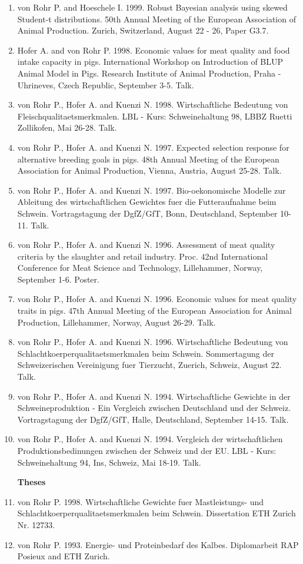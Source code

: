 \documentclass[11pt,a4paper]{scrartcl}
\begin{document}
\begin{enumerate}
\item von Rohr P. and Hoeschele I. 1999. Robust Bayesian analysis using skewed Student-t distributions. 50th Annual Meeting of the European Association of Animal Production.  Zurich, Switzerland, August 22 - 26, Paper G3.7. 
\item Hofer A. and von Rohr P. 1998. Economic values for meat quality and food intake capacity in pigs. International Workshop on Introduction of BLUP Animal Model in Pigs. Research Institute of Animal Production, Praha - Uhrineves, Czech Republic, September 3-5. Talk. 
\item von Rohr P., Hofer A. and Kuenzi N. 1998. Wirtschaftliche Bedeutung von Fleischqualitaetsmerkmalen. LBL - Kurs: Schweinehaltung 98, LBBZ Ruetti Zollikofen, Mai 26-28. Talk.
\item von Rohr P., Hofer A. and Kuenzi N. 1997. Expected selection response for alternative breeding goals in pigs. 48th Annual Meeting of the European Association for Animal Production, Vienna, Austria, August 25-28. Talk.
\item von Rohr P., Hofer A. and Kuenzi N. 1997. Bio-oekonomische Modelle zur Ableitung des wirtschaftlichen Gewichtes fuer die Futteraufnahme beim Schwein. Vortragstagung der DgfZ/GfT, Bonn, Deutschland, September 10-11. Talk. 
\item von Rohr P., Hofer A. and Kuenzi N. 1996. Assessment of meat quality criteria  by the slaughter and retail industry. Proc. 42nd International Conference for Meat Science and Technology, Lillehammer, Norway, September 1-6. Poster. 
\item von Rohr P., Hofer A. and Kuenzi N. 1996. Economic values for meat quality traits in pigs. 47th Annual Meeting of the European Association for Animal Production, Lillehammer, Norway, August 26-29. Talk. 
\item von Rohr P., Hofer A. and Kuenzi N. 1996. Wirtschaftliche Bedeutung von Schlachtkoerperqualitaetsmerkmalen beim Schwein. Sommertagung der Schweizerischen Vereinigung fuer Tierzucht, Zuerich, Schweiz, August 22. Talk.
\item von Rohr P., Hofer A. and Kuenzi N. 1994. Wirtschaftliche Gewichte in der Schweineproduktion - Ein Vergleich zwischen Deutschland und der Schweiz. Vortragstagung der DgfZ/GfT, Halle, Deutschland, September 14-15. Talk. 
\item von Rohr P., Hofer A. and Kuenzi N. 1994. Vergleich der wirtschaftlichen Produktionsbedinungen zwischen der Schweiz und der EU. LBL - Kurs: Schweinehaltung 94, Ins, Schweiz, Mai 18-19. Talk.

\vspace{2ex}
\noindent\textbf{Theses}
\item von Rohr P. 1998. Wirtschaftliche Gewichte fuer Mastleistungs- und Schlachtkoerperqualitaetsmerkmalen beim Schwein. Dissertation ETH Zurich Nr. 12733.
\item von Rohr P. 1993. Energie- und Proteinbedarf des Kalbes. Diplomarbeit RAP Posieux and ETH Zurich.
\end{enumerate}
\end{document}
